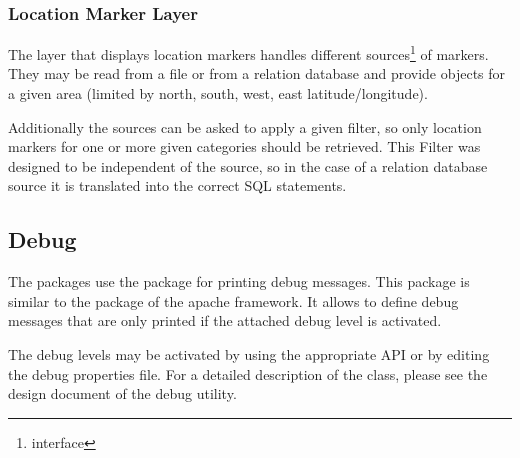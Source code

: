 \documentclass[a4paper]{article} %
\begin{document}
\subsubsection{Location Marker Layer}
\label{SoftwareDesignOfTheGpstoolPackage-LocationMarkerLayer}

The layer that displays location markers handles different
sources\footnote{interface
}
of markers. They may be read from a file or from a relation database
and provide  objects for a given area
(limited by north, south, west, east latitude/longitude).

Additionally the sources can be asked to apply a given filter, so only
location markers for one or more given categories should be
retrieved. This Filter was designed to be independent of the source,
so in the case of a relation database source it is translated into the
correct SQL statements.


\subsection{Debug}
\label{SoftwareDesignOfTheGpstoolPackage-Debug}

The  packages use the
 package for printing debug
messages. This package is similar to the  package
of the apache framework. It allows to define debug messages that are
only printed if the attached debug level is activated.

The debug levels may be activated by using the appropriate API or by
editing the debug properties file. For a detailed description of the
 class, please see the design document of the debug
utility. 










%
% 



\documentend
\end{document}
